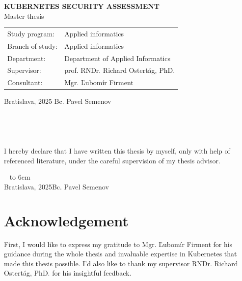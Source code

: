 \documentclass[12pt, oneside, openany]{book}
\def\mftitle{Kubernetes security assessment}
\def\mfthesistype{Master thesis}
\def\mfauthor{Bc. Pavel Semenov}
\def\mfskolitel{prof. RNDr. Richard Ostertág, PhD.}
\def\mfkonzultant{Mgr. Ľubomír Firment}
\def\mfplacedate{Bratislava, 2025}
\def\mfodbor{Applied informatics}
\def\program{Applied informatics}
\def\mfpracovisko{Department of Applied Informatics }
\begin{document}
\begin{center}
	\textbf{\MakeUppercase{\Large\mftitle}}\\
	\mfthesistype
\end{center}
\vfill


\begin{tabular}{l l}
Study program: & \program \\
Branch of study: & \mfodbor \\
Department: & \mfpracovisko \\
Supervisor: & \mfskolitel \\
Consultant: & \mfkonzultant \\
\end{tabular}

\vfill
\noindent
\mfplacedate \hfill
\mfauthor
\cleardoublepage




\newpage
\thispagestyle{empty}


\newpage
\thispagestyle{empty}





{~}\vspace{12cm}

\noindent
\begin{minipage}{0.25\textwidth}~\end{minipage}
\thispagestyle{empty}
\begin{minipage}{0.75\textwidth}
I hereby declare that I have written this thesis by myself, only with help of referenced literature, under the careful supervision of my thesis advisor.
\newline \newline
\end{minipage}
\vfill
~ \hfill {\hbox to 6cm{\dotfill}} \\
\mfplacedate \hfill \mfauthor
\vfill\eject \cleardoublepage




\newpage
\thispagestyle{empty}
\chapter*{Acknowledgement}\label{chap:thank_you}
First, I would like to express my gratitude to Mgr. Ľubomír Firment for his guidance during the whole thesis and invaluable expertise in Kubernetes that made this thesis possible. I'd also like to thank my supervisor RNDr. Richard Ostertág, PhD. for his insightful feedback.
\end{document}
